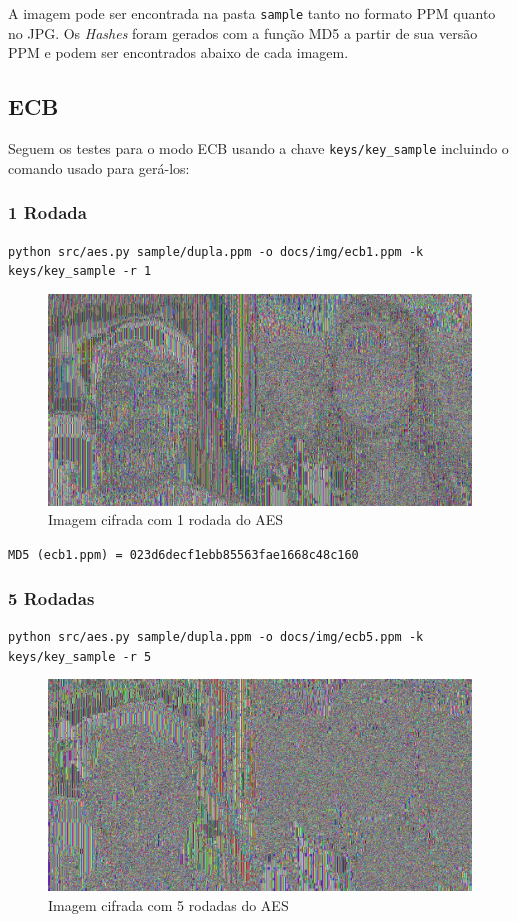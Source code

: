 \documentclass[12pt]{article}
\begin{document}
A imagem pode ser encontrada na pasta \texttt{sample} tanto no formato PPM quanto no JPG. Os \textit{Hashes} foram gerados com a função MD5 a partir de sua versão PPM e podem ser encontrados abaixo de cada imagem.

\subsection{ECB}

Seguem os testes para o modo ECB usando a chave \texttt{keys/key\_sample} incluindo o comando usado para gerá-los:

\subsubsection{1 Rodada}

\texttt{python src/aes.py sample/dupla.ppm -o docs/img/ecb1.ppm -k keys/key\_sample -r 1}

\begin{figure}[H]
	\centering
    \includegraphics[width=.5\textwidth]{img/ecb1.jpg}
    \caption{Imagem cifrada com 1 rodada do AES}
\end{figure}

\noindent \texttt{MD5 (ecb1.ppm) = 023d6decf1ebb85563fae1668c48c160}

\subsubsection{5 Rodadas}

\texttt{python src/aes.py sample/dupla.ppm -o docs/img/ecb5.ppm -k keys/key\_sample -r 5}

\begin{figure}[H]
	\centering
    \includegraphics[width=.5\textwidth]{img/ecb5.jpg}
    \caption{Imagem cifrada com 5 rodadas do AES}
\end{figure}
\end{document}
